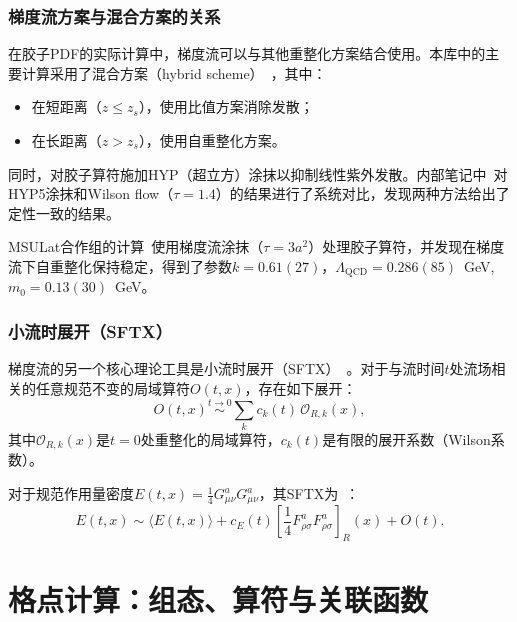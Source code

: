 \documentclass[12pt,a4paper]{ctexart}
\theoremstyle{definition}
\newcommand{\QCD}{\Lambda_{\text{QCD}}}
\begin{document}
\subsubsection{梯度流方案与混合方案的关系}

在胶子PDF的实际计算中，梯度流可以与其他重整化方案结合使用。本库中的主要计算采用了混合方案（hybrid scheme）~\cite{Ji:2020brr}，其中：
\begin{itemize}
    \item 在短距离（$z \leq z_s$），使用比值方案消除发散；
    \item 在长距离（$z > z_s$），使用自重整化方案。
\end{itemize}

同时，对胶子算符施加HYP（超立方）涂抹以抑制线性紫外发散。内部笔记中~\cite{NoteGluonPDFs}对HYP5涂抹和Wilson flow（$\tau=1.4$）的结果进行了系统对比，发现两种方法给出了定性一致的结果。

MSULat合作组的计算~\cite{NieMiera2025}使用梯度流涂抹（$\tau = 3a^2$）处理胶子算符，并发现在梯度流下自重整化保持稳定，得到了参数$k = 0.61(27)$，$\QCD = 0.286(85)$~GeV, $m_0 = 0.13(30)$~GeV。

\subsubsection{小流时展开（SFTX）}

梯度流的另一个核心理论工具是小流时展开（SFTX）~\cite{Luscher2014,Suzuki2013}。对于与流时间$t$处流场相关的任意规范不变的局域算符$O(t,x)$，存在如下展开：
\begin{equation}\label{eq:sftx_general}
    O(t,x) \overset{t \to 0}{\sim} \sum_k c_k(t) \, \mathcal{O}_{R,k}(x),
\end{equation}
其中$\mathcal{O}_{R,k}(x)$是$t=0$处重整化的局域算符，$c_k(t)$是有限的展开系数（Wilson系数）。

对于规范作用量密度$E(t,x) = \frac{1}{4} G_{\mu\nu}^a G_{\mu\nu}^a$，其SFTX为~\cite{Suzuki2013}：
\begin{equation}\label{eq:sftx_E}
    E(t,x) \sim \langle E(t,x) \rangle + c_E(t) \left[ \frac{1}{4} F_{\rho\sigma}^a F_{\rho\sigma}^a \right]_R(x) + O(t).
\end{equation}


\section{格点计算：组态、算符与关联函数}
\end{document}
